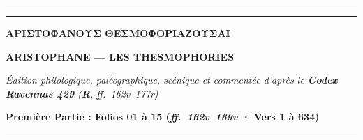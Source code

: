 \documentclass[11pt,twoside]{book}
\newlength{\larg}
\begin{document}
\thispagestyle{empty}
\vspace*{0.6cm}
\begin{center}
  {\color{ruleGold}\rule{\textwidth}{1.2pt}}\par\vspace{2pt}
  {\color{ruleGold}\rule{\textwidth}{0.4pt}}\par\vspace{0.55cm}

  {\fontsize{26pt}{32pt}\selectfont\bfseries\color{rubricRed}\policeGr ΑΡΙΣΤΟΦΑΝΟΥΣ ΘΕΣΜΟΦΟΡΙΑΖΟΥΣΑΙ}\par\vspace{0.30cm}
  {\fontsize{20pt}{24pt}\selectfont\scshape\bfseries ARISTOPHANE — LES THESMOPHORIES}\par\vspace{0.28cm}
  {\large\itshape\color{sepiaNote}Édition philologique, paléographique, scénique et commentée d'après le \textbf{Codex Ravennas 429} (\textbf{R}, ff.~162v–177r)}\par\vspace{0.15cm}
  {\normalsize\bfseries\color{rubricRed}Première Partie : Folios 01 à 15 (\textit{ff.~162v–169v} · Vers 1 à 634)}\par\vspace{0.45cm}

  {\color{ruleGold}\rule{0.45\textwidth}{0.6pt}}\par\vspace{0.45cm}
\end{center}
\end{document}
